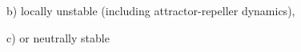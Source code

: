 \documentclass{article}
\begin{document}
b) locally unstable (including attractor-repeller dynamics),
\vspace{1cm}



c) or neutrally stable
\vspace{1cm}

\end{document}

